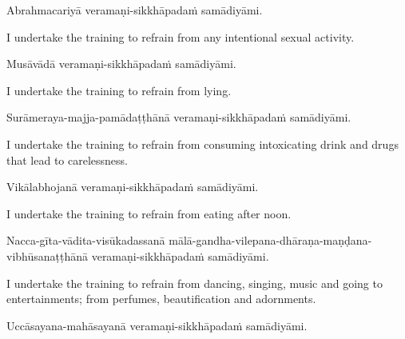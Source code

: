 Abrahmacariyā veramaṇi-sikkhāpadaṁ samādiyāmi.

\begin{english-hang}
  I undertake the training to refrain from any intentional sexual activity.
\end{english-hang}

Musāvādā veramaṇi-sikkhāpadaṁ samādiyāmi.

\begin{english}
  I undertake the training to refrain from lying.
\end{english}

\begin{pali-hang}
Surāmeraya-majja-pamādaṭṭhānā veramaṇi-sikkhāpadaṁ samādiyāmi.
\end{pali-hang}

\begin{english-hang}
  I undertake the training to refrain from consuming intoxicating drink and drugs that\hyperlink{endnote138-appendix}{\hypertarget{endnote138-body}{}}
  lead to carelessness.
\end{english-hang}

Vikālabhojanā veramaṇi-sikkhāpadaṁ samādiyāmi.

\begin{english}
  I undertake the training to refrain from eating after noon.\hyperlink{endnote139-appendix}{\hypertarget{endnote139-body}{}}
  \end{english}

\begin{pali-hang}
Nacca-gīta-vādita-visūkadassanā mālā-gandha-vilepana-dhāraṇa-maṇḍana-vibhūsanaṭṭhānā veramaṇi-sikkhāpadaṁ samādiyāmi.
\end{pali-hang}

\begin{english-hang}
  I undertake the training to refrain from dancing, singing, music and going to entertainments; from perfumes, beautification and adornments.\hyperlink{endnote140-appendix}{\hypertarget{endnote140-body}{}}
  \end{english-hang}

Uccāsayana-mahāsayanā veramaṇi-sikkhāpadaṁ samādiyāmi.

